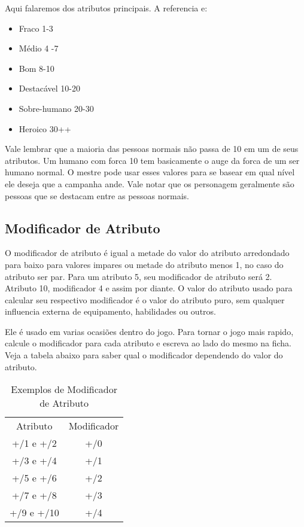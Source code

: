 Aqui falaremos dos atributos principais. A referencia e:

\begin{itemize}
	\item Fraco 1-3
	\item Médio 4 -7
	\item Bom 8-10
	\item Destacável 10-20
	\item Sobre-humano 20-30
	\item Heroico 30++
\end{itemize}

Vale lembrar que a maioria das pessoas normais não passa de 10 em um de seus atributos. Um humano com forca 10 tem basicamente o auge da forca de um ser humano normal. O mestre pode usar esses valores para se basear em qual nível ele deseja que a campanha ande. Vale notar que os personagem geralmente são pessoas que se destacam entre as pessoas normais.

\subsection{Modificador de Atributo}

O modificador de atributo é igual a metade do valor do atributo arredondado para baixo para valores impares ou metade do atributo menos 1, no caso do atributo ser par. Para um atributo 5, seu modificador de atributo será 2. Atributo 10, modificador 4 e assim por diante. O valor do atributo usado para calcular seu respectivo modificador é o valor do atributo puro, sem qualquer influencia externa de equipamento, habilidades ou outros.

Ele é usado em varias ocasiões dentro do jogo. Para tornar o jogo mais rapido, calcule o modificador para cada atributo e escreva ao lado do mesmo na ficha. Veja a tabela abaixo para saber qual o modificador dependendo do valor do atributo.

\begin{table}[htbp]
\begin{center}
\begin{tabular}{|c|c|} \hline 
Atributo&	 Modificador\\\cline{1-2} 
+/1 e +/2&	 +/0\\ \hline
+/3 e +/4&	 +/1\\ \hline
+/5 e +/6&	 +/2\\ \hline
+/7 e +/8&	 +/3\\ \hline
+/9 e +/10&	 +/4\\ \hline
\end{tabular}
\end{center}
\caption{Exemplos de Modificador de Atributo}
\label{}
\end{table}


